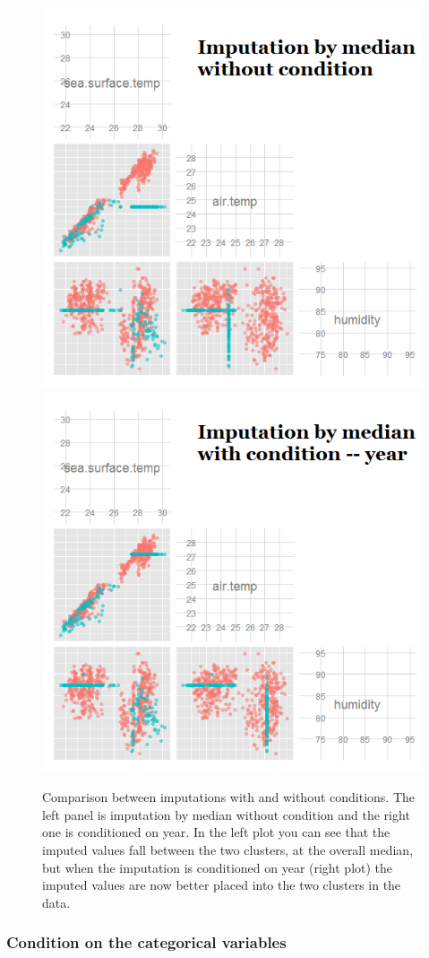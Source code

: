 \documentclass[english]{article}
\begin{document}
\begin{center}
%
\begin{figure}[h]
\begin{centering}
\includegraphics[width=.48\textwidth]{fig4-1}
\includegraphics[width=.48\textwidth]{fig4-2}
\par\end{centering}

\caption{\label{fig: condition}{Comparison between imputations
with and without conditions. The left panel is imputation by median
without condition and the right one is conditioned on year. In the left plot you can see that the imputed values fall between the two clusters, at the overall median, but when the imputation is conditioned on year (right plot) the imputed values are now better placed into the two clusters in the data.}}

\end{figure}

\par\end{center}

\subsubsection{Condition on the categorical variables}
\end{document}
